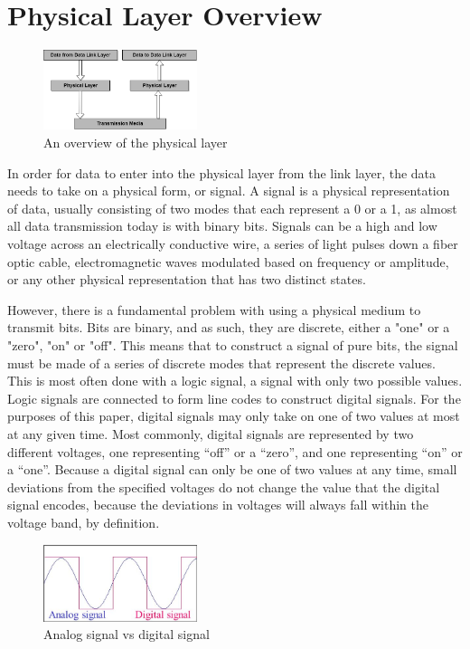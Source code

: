 \documentclass[11pt]{article}
\begin{document}
\section{Physical Layer Overview}

\begin{figure}[!htbp]
    \centering
    \includegraphics[width=0.4\textwidth]{PhysicalLayerOverview.png}
    \caption{An overview of the physical layer}
    \label{fig:PhysicalLayerOverview}
\end{figure}

In order for data to enter into the physical layer from the link layer, the data needs to take on a physical form, or signal. A signal is a physical representation of data, usually consisting of two modes that each represent a 0 or a 1, as almost all data transmission today is with binary bits. Signals can be a high and low voltage across an electrically conductive wire, a series of light pulses down a fiber optic cable, electromagnetic waves modulated based on frequency or amplitude, or any other physical representation that has two distinct states.

However, there is a fundamental problem with using a physical medium to transmit bits. Bits are binary, and as such, they are discrete, either a "one" or a "zero", "on" or "off". This means that to construct a signal of pure bits, the signal must be made of a series of discrete modes that represent the discrete values. This is most often done with a logic signal, a signal with only two possible values. Logic signals are connected to form line codes to construct digital signals. For the purposes of this paper, digital signals may only take on one of two values at most at any given time. Most commonly, digital signals are represented by two different voltages, one representing “off” or a “zero”, and one representing “on” or a “one”. Because a digital signal can only be one of two values at any time, small deviations from the specified voltages do not change the value that the digital signal encodes, because the deviations in voltages will always fall within the voltage band, by definition. 

\begin{figure}[!htbp]
    \centering
    \includegraphics[width=0.4\textwidth]{analogdigitalsignalsForPaper.png}
    \caption{Analog signal vs digital signal}
    \label{fig:AnalogsignalvsDigitalsignal}
\end{figure}
\end{document}
